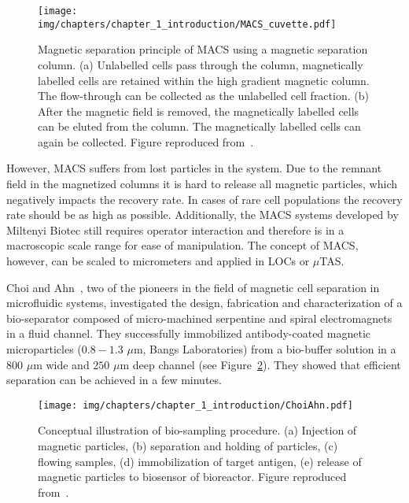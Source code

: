\begin{figure}[htb]
        \centering
		\texttt{[image: img/chapters/chapter\_1\_introduction/MACS\_cuvette.pdf]}
		\caption[Magnetic activated cell sorting principle]{Magnetic separation principle of MACS using a magnetic separation column. (a) Unlabelled cells pass through the column, magnetically labelled cells are retained within the high gradient magnetic column. The flow-through can be collected as the unlabelled cell fraction. (b) After the magnetic field is removed, the magnetically labelled cells can be eluted from the column. The magnetically labelled cells can again be collected. Figure reproduced from~\cite{MiltenyiBiotec2017}.}
\label{fig:MACS}
\end{figure}

However, MACS suffers from lost particles in the system. Due to the remnant field in the magnetized columns it is hard to release all magnetic particles, which negatively impacts the recovery rate. In cases of rare cell populations the recovery rate should be as high as possible. Additionally, the MACS systems developed by Miltenyi Biotec still requires operator interaction and therefore is in a macroscopic scale range for ease of manipulation. The concept of MACS, however, can be scaled to micrometers and applied in LOCs or $\mu$TAS. 

Choi and Ahn~\cite{Choi2000,Choi2001}, two of the pioneers in the field of magnetic cell separation in microfluidic systems, investigated the design, fabrication and characterization of a bio-separator composed of micro-machined serpentine and spiral electromagnets in a fluid channel. They successfully immobilized antibody-coated magnetic microparticles ($0.8-1.3$ $\mu$m, Bangs Laboratories) from a bio-buffer solution in a $800$ $\mu$m wide and $250$ $\mu$m deep channel (see Figure~\ref{fig:Choi2000}). They showed that efficient separation can be achieved in a few minutes.

\begin{figure}[htb]
   \centering
   \texttt{[image: img/chapters/chapter\_1\_introduction/ChoiAhn.pdf]}
   \caption[Micro-machined bio-separator with an integrated electromagnet]{Conceptual illustration of bio-sampling procedure. (a) Injection of magnetic particles, (b) separation and holding of particles, (c) flowing samples, (d) immobilization of target antigen, (e) release of magnetic particles to biosensor of bioreactor. Figure reproduced from~\cite{Choi2000}.}
   \label{fig:Choi2000}
\end{figure}

